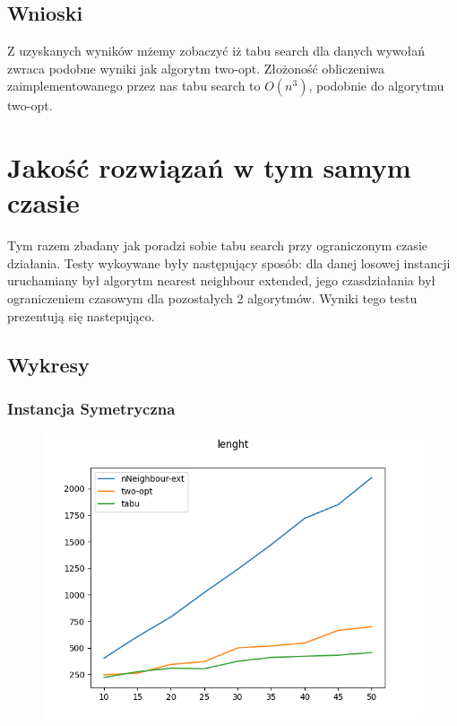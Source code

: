 \documentclass[11pt]{article}
\begin{document}
    \subsection{Wnioski }   
    Z uzyskanych wyników mżemy zobaczyć iż tabu search dla danych wywołań zwraca podobne wyniki 
    jak algorytm two-opt. Złożoność obliczeniwa zaimplementowanego przez nas tabu search
    to $O(n^3)$, podobnie do algorytmu two-opt.







\section{Jakość rozwiązań w tym samym czasie }
        Tym razem zbadany jak poradzi sobie tabu search przy ograniczonym czasie działania.
        Testy wykoywane były następujący sposób: dla danej losowej instancji uruchamiany był algorytm
        nearest neighbour extended, jego czasdziałania był ograniczeniem czasowym dla pozostałych 2
        algorytmów. Wyniki tego testu prezentują się nastepująco.
    \subsection{Wykresy }
        \subsubsection{Instancja Symetryczna }
                \begin{center}
                \begin{figure}[H]

                    \includegraphics[scale=0.6]{timedSymetricLenght.png}

                \end{figure}
                \end{center}
\end{document}

